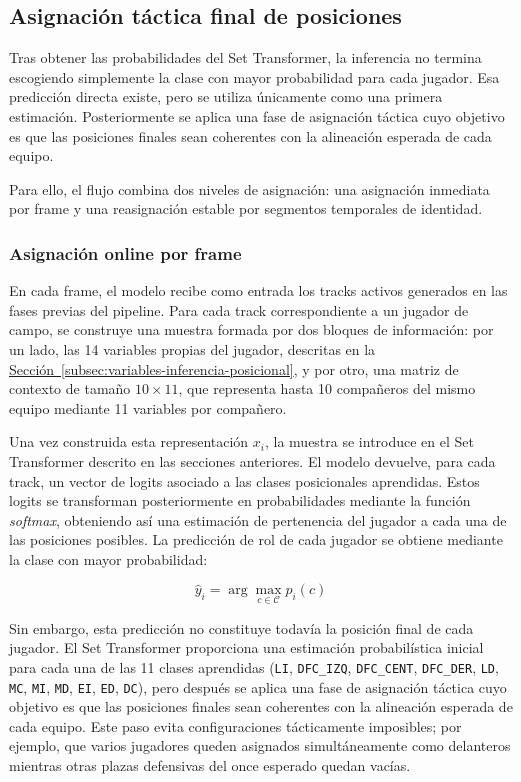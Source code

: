 \subsection{Asignación táctica final de posiciones}
\label{subsec:asignacion-tactica-final-posiciones}

Tras obtener las probabilidades del Set Transformer, la inferencia no termina escogiendo simplemente la clase con mayor probabilidad para cada jugador. Esa predicción directa existe, pero se utiliza únicamente como una primera estimación. Posteriormente se aplica una fase de asignación táctica cuyo objetivo es que las posiciones finales sean coherentes con la alineación esperada de cada equipo.

Para ello, el flujo combina dos niveles de asignación: una asignación inmediata por frame y una reasignación estable por segmentos temporales de identidad.

\subsubsection{Asignación online por frame}

En cada frame, el modelo recibe como entrada los tracks activos generados en las fases previas del pipeline. Para cada track correspondiente a un jugador de campo, se construye una muestra formada por dos bloques de información: por un lado, las 14 variables propias del jugador, descritas en la \hyperref[subsec:variables-inferencia-posicional]{Sección~\ref*{subsec:variables-inferencia-posicional}}, y por otro, una matriz de contexto de tamaño \(10 \times 11\), que representa hasta 10 compañeros del mismo equipo mediante 11 variables por compañero.

Una vez construida esta representación $x_i$, la muestra se introduce en el Set Transformer descrito en las secciones anteriores. El modelo devuelve, para cada track, un vector de logits asociado a las clases posicionales aprendidas. Estos logits se transforman posteriormente en probabilidades mediante la función \textit{softmax}, obteniendo así una estimación de pertenencia del jugador a cada una de las posiciones posibles. La predicción de rol de cada jugador se obtiene mediante la clase con mayor probabilidad:

\[
\hat{y}_i = \arg\max_{c \in \mathcal{C}} p_i(c)
\]

Sin embargo, esta predicción no constituye todavía la posición final de cada jugador. El Set Transformer proporciona una estimación probabilística inicial para cada una de las 11 clases aprendidas (\texttt{LI}, \texttt{DFC\_IZQ}, \texttt{DFC\_CENT}, \texttt{DFC\_DER}, \texttt{LD}, \texttt{MC}, \texttt{MI}, \texttt{MD}, \texttt{EI}, \texttt{ED}, \texttt{DC}), pero después se aplica una fase de asignación táctica cuyo objetivo es que las posiciones finales sean coherentes con la alineación esperada de cada equipo. Este paso evita configuraciones tácticamente imposibles; por ejemplo, que varios jugadores queden asignados simultáneamente como delanteros mientras otras plazas defensivas del once esperado quedan vacías.

